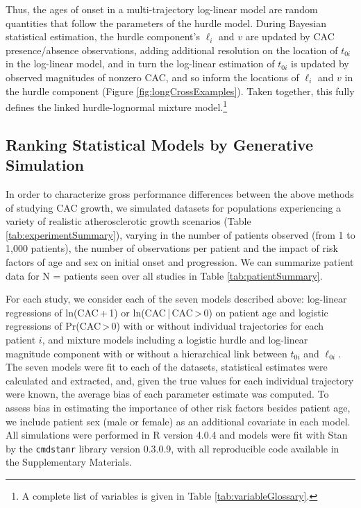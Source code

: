 \documentclass[a4paper, 10pt]{article}
\begin{document}
Thus, the ages of onset in a multi-trajectory log-linear model are random quantities that follow the parameters of the hurdle model. During Bayesian statistical estimation, the hurdle component's $\ell_i$ and $v$ are updated by CAC presence/absence observations, adding additional resolution on the location of $t_{0i}$ in the log-linear model, and in turn the log-linear estimation of $t_{0i}$ is updated by observed magnitudes of nonzero CAC, and so inform the locations of $\ell_i$ and $v$ in the hurdle component (Figure \ref{fig:longCrossExamples}). Taken together, this fully defines the linked hurdle-lognormal mixture model.\footnote{A complete list of variables is given in Table \ref{tab:variableGlossary}.}

\subsection{Ranking Statistical Models by Generative Simulation}

In order to characterize gross performance differences between the above methods of studying CAC growth, we simulated \numStudies{} datasets for populations experiencing a variety of realistic atherosclerotic growth scenarios (Table \ref{tab:experimentSummary}), varying in the number of patients observed (from 1 to 1,000 patients), the number of observations per patient and the impact of risk factors of age and sex on initial onset and progression. We can summarize patient data for N = \numPatients{} patients seen over all \numStudies{} studies in Table \ref{tab:patientSummary}.

For each study, we consider each of the seven models described above: log-linear regressions of ln(CAC\,+\,1) or ln(CAC\,|\,CAC\,>\,0) on patient age and logistic regressions of Pr(CAC\,>\,0) with or without individual trajectories for each patient $i$, and mixture models including a logistic hurdle and log-linear magnitude component with or without a hierarchical link between $t_{0i}$ and $\ell_{0i}$. The seven models were fit to each of the \numStudies{} datasets, statistical estimates were calculated and extracted, and, given the true values for each individual trajectory were known, the average bias of each parameter estimate was computed. To assess bias in estimating the importance of other risk factors besides patient age, we include patient sex (male or female) as an additional covariate in each model. All simulations were performed in R version 4.0.4 and models were fit with Stan by the \texttt{cmdstanr} library version 0.3.0.9, with all reproducible code available in the Supplementary Materials.
\end{document}
